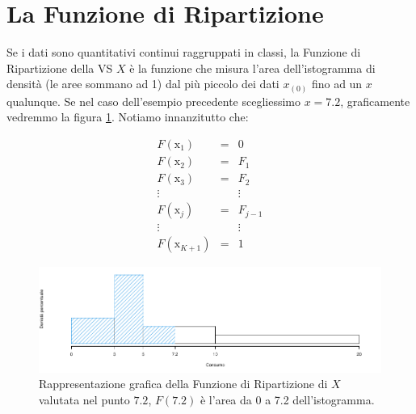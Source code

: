 \documentclass[
  11pt,
]{book}
\theoremstyle{mytheoremstyle}
\theoremstyle{mydefstyle}
\begin{document}
\section{La Funzione di Ripartizione}\label{la-funzione-di-ripartizione}

Se i dati sono quantitativi continui raggruppati in classi, la Funzione di Ripartizione
della VS \(X\) è la funzione che misura l'area dell'istogramma di densità (le aree sommano ad 1)
dal più piccolo dei dati \(x_{(0)}\) fino ad un \(x\) qualunque.
Se nel caso dell'esempio precedente scegliessimo \(x=7.2\), graficamente vedremmo la figura \ref{fig:FdR}.
Notiamo innanzitutto che:

\begin{eqnarray*}
   F(\text{x}_1)&=&  0\\
   F(\text{x}_2) &=& F_1\\
   F(\text{x}_3) &=& F_2\\
   \vdots~~~ && \vdots\\
   F(\text{x}_j) &=& F_{j-1}\\   
   \vdots~~~ && \vdots\\
   F(\text{x}_{K+1}) &=& 1   
\end{eqnarray*}

\begin{figure}[H]

{\centering \includegraphics{Appunti_di_Statistica_2025_files/figure-latex/FdR-1} 

}

\caption{Rappresentazione grafica della Funzione di Ripartizione di $X$ valutata nel punto $7.2$, $F(7.2)$ è l'area da 0 a 7.2 dell'istogramma.}\label{fig:FdR}
\end{figure}
\end{document}
